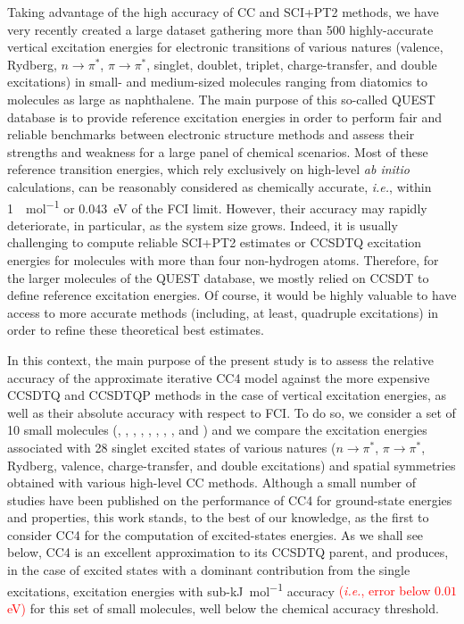 \documentclass[aip,jcp,reprint,noshowkeys,superscriptaddress]{revtex4-1}
\newcommand{\alert}[1]{\textcolor{red}{#1}}
\newcommand{\ie}{\textit{i.e.}}
\newcommand{\npis}{n \to \pi^*}
\newcommand{\pipis}{\pi \to \pi^*}
\begin{document}
Taking advantage of the high accuracy of CC and SCI+PT2 methods, we have very recently created a large dataset gathering more than 500 highly-accurate vertical excitation energies for electronic transitions of various natures (valence, Rydberg, $\npis$, $\pipis$, singlet, doublet, triplet, charge-transfer, and double excitations) in small- and medium-sized molecules ranging from diatomics to molecules as large as naphthalene. \cite{Loos_2018a,Loos_2019,Loos_2020a,Loos_2020b,Loos_2020c,Veril_2021}
The main purpose of this so-called QUEST database is to provide reference excitation energies in order to perform fair and reliable benchmarks between electronic structure methods and assess their strengths and weakness for a large panel of chemical scenarios.
Most of these reference transition energies, which rely exclusively on high-level \textit{ab initio} calculations, can be reasonably considered as chemically accurate, \ie, within \SI{1}{\kcal\per\mol} or \SI{0.043}{\eV} of the FCI limit.
However, their accuracy may rapidly deteriorate, in particular, as the system size grows.
Indeed, it is usually challenging to compute reliable SCI+PT2 estimates or CCSDTQ excitation energies for molecules with more than four non-hydrogen atoms.
Therefore, for the larger molecules of the QUEST database, we mostly relied on CCSDT to define reference excitation energies.
Of course, it would be highly valuable to have access to more accurate methods (including, at least, quadruple excitations) in order to refine these theoretical best estimates.

In this context, the main purpose of the present study is to assess the relative accuracy of the approximate iterative CC4 model against the more expensive CCSDTQ and CCSDTQP methods in the case of vertical excitation energies, as well as their absolute accuracy with respect to FCI.
To do so, we consider a set of 10 small molecules (, , , , , , , ,  and ) and we compare the excitation energies associated with 28 singlet excited states of various natures ($\npis$, $\pipis$, Rydberg, valence, charge-transfer, and double excitations) and spatial symmetries obtained with various high-level CC methods.
Although a small number of studies have been published on the performance of CC4 for ground-state energies and properties, \cite{Kallay_2005,Matthews_2021} this work stands, to the best of our knowledge, as the first to consider CC4 for the computation of excited-states energies.
As we shall see below, CC4 is an excellent approximation to its CCSDTQ parent, and produces, in the case of excited states with a dominant contribution from the single excitations, excitation energies with sub-\si{\kJ\per\mol} accuracy \alert{(\textit{i.e.}, error below $0.01$ eV)} for this set of small molecules, well below the chemical accuracy threshold.
\end{document}
